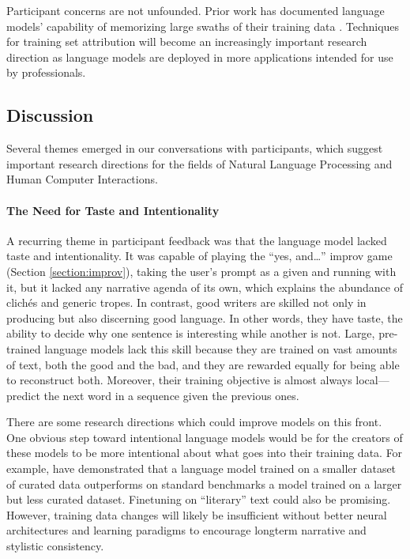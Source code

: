 Participant concerns are not unfounded.
Prior work has documented language models' capability of memorizing large swaths of their training data \citep{carlini2020extracting,carlini2022quantifying}.
Techniques for training set attribution will become an increasingly important research direction as language models are deployed in more applications intended for use by professionals.

\subsection{Discussion}
Several themes emerged in our conversations with participants, which suggest important research directions for the fields of Natural Language Processing and Human Computer Interactions.

\paragraph{The Need for Taste and Intentionality}

A recurring theme in participant feedback was that the language model lacked taste and intentionality.
It was capable of playing the ``yes, and…'' improv game (Section \ref{section:improv}), taking the user's prompt as a given and running with it, but it lacked any narrative agenda of its own, which explains the abundance of clichés and generic tropes.
In contrast, good writers are skilled not only in producing but also discerning good language.
In other words, they have taste, the ability to decide why one sentence is interesting while another is not.
Large, pre-trained language models lack this skill because they are trained on vast amounts of text, both the good and the bad, and they are rewarded equally for being able to reconstruct both.
Moreover, their training objective is almost always local---predict the next word in a sequence given the previous ones.

There are some research directions which could improve models on this front.
One obvious step toward intentional language models would be for the creators of these models to be more intentional about what goes into their training data.
For example, \citep{du2022glam} have demonstrated that a language model trained on a smaller dataset of curated data outperforms on standard benchmarks a model trained on a larger but less curated dataset.
Finetuning on ``literary'' text could also be promising.
However, training data changes will likely be insufficient without better neural architectures and learning paradigms to encourage longterm narrative and stylistic consistency.

